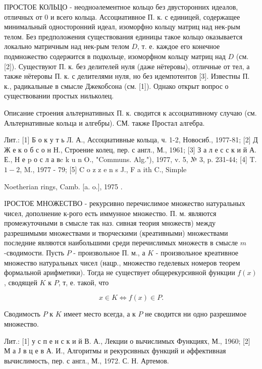\documentclass[10pt]{article}
\begin{document}
ПРОСТОЕ КОЛЬЦО - неодноәлементное кольцо без двусторонних идеалов, отличных от 0 и всего кольца. Ассоциативное П. к. с единицей, содержащее минимальный односторонний идеал, изоморфно кольцу матриц над нек-рым телом. Без предположения существования единицы такое кольцо оказывается локально матричным над нек-рым телом $D$, т. е. каждое его конечное подмножество содержится в подкольце, изоморфном кольцу матриц над $D$ (см. [2]). Существуют П. к. без делителей нуля (даже нётеровы), отличные от тел, а также нётеровы П. к. с делителями нуля, но без идемпотентов [3]. Известны П. к., радикальные в смысле Джекобсона (см. [1]). Однако открыт вопрос о существовании простых нильколец.



Описание строения альтернативных П. к. сводится к ассоциативному случаю (см. Альтернативные кольца и алгебры). СМ. также Простал алгебра.



Лит.: [1] Б о к у т ь Л. А., Ассоциативные кольца, ч. 1-2, Новосиб., 1977-81; [2] Д Ж е к о б с о н Н., Строение колец, пер. с англ., М., 1961; [3] З а л е с с к и й А. Е., Н е p о с л а вc k u n O., "Communs. Alg."), 1977, v. 5, № 3, p. 231-44; [4] T. $1-2$, M., 1977 - 79; [5] C o z z e n s J., F a ith C., Simple

Noetherian rings, Camb. [a. o.], 1975 .



IРОСТОЕ МНОЖЕСТВО - рекурсивно перечислимое множество натуральных чисел, дополнение к-рого есть иммунное множество. П. м. являются промежуточными в смысле так наз. сивная теория множеств) между разрешимыми множествами и творческими (креативными) множествами последние являются наибольшими среди перечислимых множеств в смысле $m$-сводимости. Пусть $P$ - произвольное П. м., а $K$ - произвольное креативное множество натуральных чисел (нацр., множество геделевых номеров теорем формальной арифметики). Тогда не существует общерекурсивной функции $f(x)$, сводящей $K$ к $P$, т, е. такой, что



\[

x \in K \Leftrightarrow f(x) \in P .

\]



Сводимость $P$ к $K$ имеет место всегда, а к $P$ не сводится ни одно разрешимое множество.



Лит.: [1] у с п е н с к и й В. А., Лекции о вычислимых Функциях, М., 1960; [2] М а Ј в ц е в А. И., Алгоритмы и рекурсивных функций и әффективная вычислимость, пер. с англ., М., 1972. С. Н. Артемов.
\end{document}
